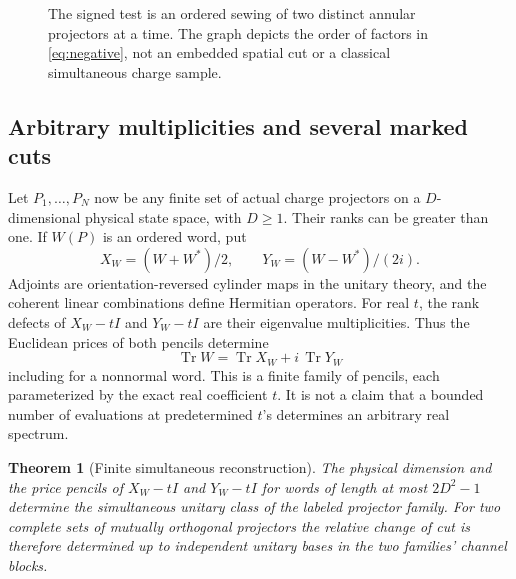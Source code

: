 \documentclass[11pt]{article}
\numberwithin{equation}{section}
\newtheorem{theorem}{Theorem}[section]
\theoremstyle{definition}
\theoremstyle{remark}
\DeclareMathOperator{\Tr}{Tr}
\begin{document}
\begin{figure}[tbp]
\centering
{}
\caption{The signed test is an ordered sewing of two distinct annular projectors at a time. The graph depicts the order of factors in \eqref{eq:negative}, not an embedded spatial cut or a classical simultaneous charge sample.}
\label{fig:cycle}
\end{figure}

\subsection{Arbitrary multiplicities and several marked cuts}

Let \(P_1,\ldots,P_N\) now be any finite set of actual charge projectors on a \(D\)-dimensional physical state space, with \(D\ge1\). Their ranks can be greater than one. If \(W(P)\) is an ordered word, put
\[
 X_W=(W+W^*)/2,\qquad Y_W=(W-W^*)/(2i).
\]
Adjoints are orientation-reversed cylinder maps in the unitary theory, and the coherent linear combinations define Hermitian operators. For real \(t\), the rank defects of \(X_W-tI\) and \(Y_W-tI\) are their eigenvalue multiplicities. Thus the Euclidean prices of both pencils determine
\begin{equation}\label{eq:trace}
       \Tr W=\Tr X_W+i\,\Tr Y_W
\end{equation}
including for a nonnormal word. This is a finite family of pencils, each parameterized by the exact real coefficient \(t\). It is not a claim that a bounded number of evaluations at predetermined \(t\)'s determines an arbitrary real spectrum.

\begin{theorem}[Finite simultaneous reconstruction]\label{thm:general}
The physical dimension and the price pencils of \(X_W-tI\) and \(Y_W-tI\) for words of length at most \(2D^2-1\) determine the simultaneous unitary class of the labeled projector family. For two complete sets of mutually orthogonal projectors the relative change of cut is therefore determined up to independent unitary bases in the two families' channel blocks.
\end{theorem}
\end{document}
